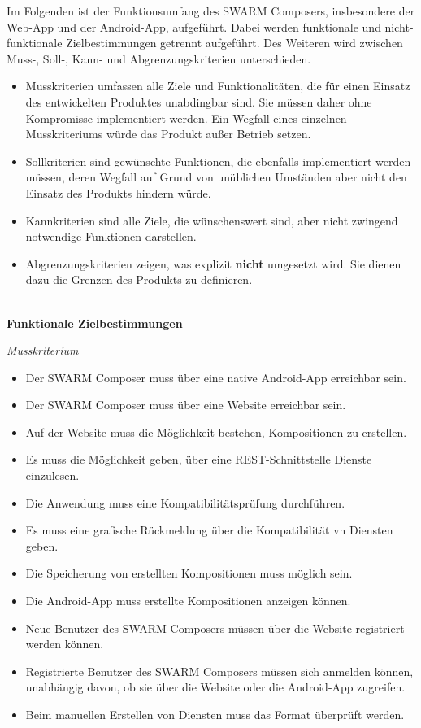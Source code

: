 Im Folgenden ist der Funktionsumfang des SWARM Composers, insbesondere der Web-App und der Android-App, aufgeführt. Dabei werden funktionale und nicht-funktionale Zielbestimmungen getrennt aufgeführt. Des Weiteren wird zwischen Muss-, Soll-, Kann- und Abgrenzungskriterien unterschieden.
%
\begin{itemize}[leftmargin=4pc]
	\item Musskriterien umfassen alle Ziele und Funktionalitäten, die für einen Einsatz des entwickelten Produktes unabdingbar sind.
	Sie müssen daher ohne Kompromisse implementiert werden. Ein Wegfall eines einzelnen Musskriteriums würde das Produkt außer Betrieb setzen.
	\item Sollkriterien sind gewünschte Funktionen, die ebenfalls implementiert werden müssen, deren Wegfall auf Grund von unüblichen Umständen aber nicht den Einsatz des Produkts hindern würde.
	\item Kannkriterien sind alle Ziele, die wünschenswert sind, aber nicht zwingend notwendige Funktionen darstellen. 
	\item Abgrenzungskriterien zeigen, was explizit \textbf{nicht} umgesetzt wird. Sie dienen dazu die Grenzen des Produkts zu definieren.
	\\\\
\end{itemize}
%

\textbf{Funktionale Zielbestimmungen}\newline
%

\textit{Musskriterium}

\begin{itemize}[leftmargin=4pc]
	\item Der SWARM Composer muss über eine native Android-App erreichbar sein.
	\item Der SWARM Composer muss über eine Website erreichbar sein.
	\item Auf der Website muss die Möglichkeit bestehen, Kompositionen zu erstellen.
	\item Es muss die Möglichkeit geben, über eine REST-Schnittstelle Dienste einzulesen.
	\item Die Anwendung muss eine Kompatibilitätsprüfung durchführen.
	\item Es muss eine grafische Rückmeldung über die Kompatibilität vn Diensten geben.
	\item Die Speicherung von erstellten Kompositionen muss möglich sein.
	\item Die Android-App muss erstellte Kompositionen anzeigen können.
	\item Neue Benutzer des SWARM Composers müssen über die Website registriert werden können.
	\item Registrierte Benutzer des SWARM Composers müssen sich anmelden können, unabhängig davon, ob sie über die Website oder die Android-App zugreifen.
	\item Beim manuellen Erstellen von Diensten muss das Format überprüft werden.
\end{itemize}

